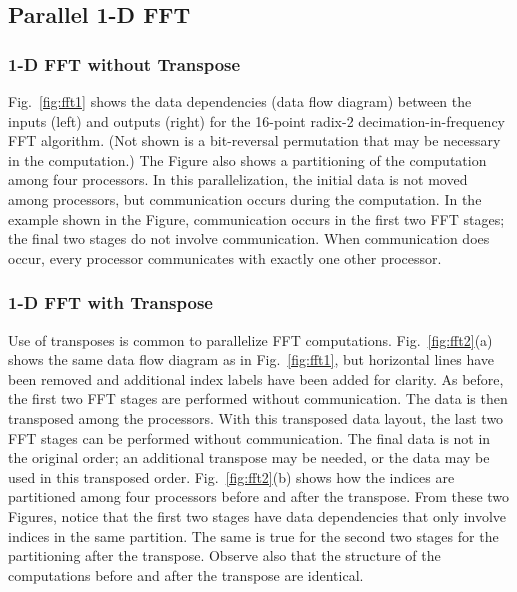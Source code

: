 \subsection{Parallel 1-D FFT}

\subsubsection*{1-D FFT without Transpose}
Fig.~\ref{fig:fft1} shows the data dependencies (data flow diagram)
between the inputs (left) and outputs (right) for the 16-point radix-2
decimation-in-frequency FFT algorithm.  (Not shown is a bit-reversal
permutation that may be necessary in the computation.)  The Figure
also shows a partitioning of the computation among four processors.
In this parallelization, the initial data is not moved among processors,
but communication occurs during the computation.  In the example shown in
the Figure, communication occurs in the first two FFT stages; the final
two stages do not involve communication.  When communication does occur,
every processor communicates with exactly one other processor.

\subsubsection*{1-D FFT with Transpose}
Use of transposes is common to parallelize FFT computations.
Fig.~\ref{fig:fft2}(a) shows the same data flow diagram as in
Fig.~\ref{fig:fft1}, but horizontal lines have been removed and additional
index labels have been added for clarity.  As before, the first two FFT
stages are performed without communication.  The data is then transposed
among the processors.  With this transposed data layout, the last two
FFT stages can be performed without communication.  The final data is
not in the original order; an additional transpose may be needed, or the
data may be used in this transposed order.  Fig.~\ref{fig:fft2}(b) shows
how the indices are partitioned among four processors before and after
the transpose.  From these two Figures, notice that the first two stages
have data dependencies that only involve indices in the same partition.
The same is true for the second two stages for the partitioning after
the transpose.  Observe also that the structure of the computations
before and after the transpose are identical.


